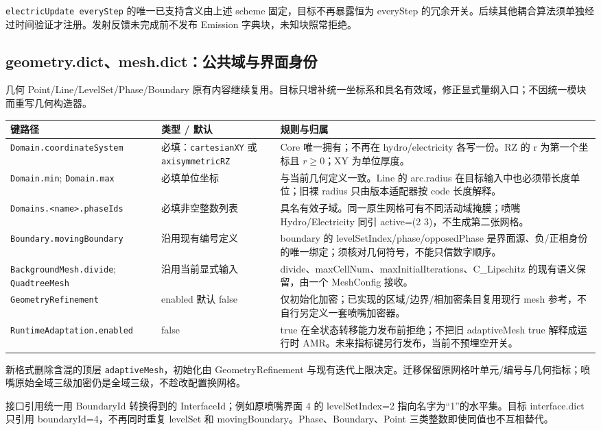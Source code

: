 \documentclass[UTF8,a4paper,11pt,fontset=fandol]{ctexart}
\numberwithin{equation}{section}
\newcommand{\code}[1]{\nolinkurl{#1}}
\begin{document}
\texttt{electricUpdate everyStep} 的唯一已支持含义由上述 scheme 固定，目标不再暴露恒为 everyStep 的冗余开关。后续其他耦合算法须单独经过时间验证才注册。发射反馈未完成前不发布 Emission 字典块，未知块照常拒绝。

\subsection{geometry.dict、mesh.dict：公共域与界面身份}
几何 Point/Line/LevelSet/Phase/Boundary 原有内容继续复用。目标只增补统一坐标系和具名有效域，修正显式量纲入口；不因统一模块而重写几何构造器。
\begin{longtable}{@{}P{.36\textwidth}P{.23\textwidth}P{.35\textwidth}@{}}
\toprule 键路径 & 类型 / 默认 & 规则与归属\\\midrule\endhead
\code{Domain.coordinateSystem} & 必填：\code{cartesianXY} 或 \code{axisymmetricRZ} & Core 唯一拥有；不再在 hydro/electricity 各写一份。RZ 的 r 为第一个坐标且 $r\ge0$；XY 为单位厚度。\\
\code{Domain.min}; \code{Domain.max} & 必填单位坐标 & 与当前几何定义一致。Line 的 arc.radius 在目标输入中也必须带长度单位；旧裸 radius 只由版本适配器按 code 长度解释。\\
\code{Domains.<name>.phaseIds} & 必填非空整数列表 & 具名有效子域。同一原生网格可有不同活动域掩膜；喷嘴 Hydro/Electricity 同引 active=(2 3)，不生成第二张网格。\\
\code{Boundary.movingBoundary} & 沿用现有编号定义 & boundary 的 levelSetIndex/phase/opposedPhase 是界面源、负/正相身份的唯一绑定；须核对几何符号，不能只信数字顺序。\\
\code{BackgroundMesh.divide}; \code{QuadtreeMesh} & 沿用当前显式输入 & divide、maxCellNum、maxInitialIterations、C\_Lipschitz 的现有语义保留，由一个 MeshConfig 接收。\\
\code{GeometryRefinement} & enabled 默认 false & 仅初始化加密；已实现的区域/边界/相加密条目复用现行 mesh 参考，不自行另定义一套喷嘴加密器。\\
\code{RuntimeAdaptation.enabled} & false & true 在全状态转移能力发布前拒绝；不把旧 adaptiveMesh true 解释成运行时 AMR。未来指标键另行发布，当前不预埋空开关。\\
\bottomrule
\end{longtable}
新格式删除含混的顶层 \code{adaptiveMesh}，初始化由 GeometryRefinement 与现有迭代上限决定。迁移保留原网格叶单元/编号与几何指标；喷嘴原始全域三级加密仍是全域三级，不趁改配置换网格。

接口引用统一用 BoundaryId 转换得到的 InterfaceId；例如原喷嘴界面 4 的 levelSetIndex=2 指向名字为“1”的水平集。目标 interface.dict 只引用 boundaryId=4，不再同时重复 levelSet 和 movingBoundary。Phase、Boundary、Point 三类整数即使同值也不互相替代。
\end{document}
